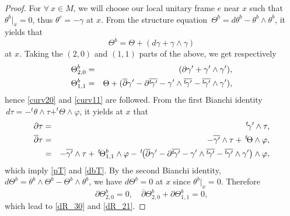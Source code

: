 \documentclass{amsart}
\numberwithin{equation}{section}
\theoremstyle{definition}
\renewcommand{\1}{\mathds{1}}
\renewcommand{\>}{\rightarrow}
\begin{document}
\begin{proof}
For $\forall\ x\in M$, we will choose our local unitary frame $e$ near $x$ such that $\theta^b\big|_{x}=0$, thus $\theta^c=-\gamma$ at $x$.
From the structure equation $\, \Theta^b = d \theta^b - \theta^b \wedge \theta^b$,  it yields that
\[\Theta^b = \Theta +  (d \gamma +  \gamma \wedge \gamma) \]
at $x$. Taking the $(2,0)$ and $(1,1)$ parts of the above, we get respectively
\begin{eqnarray}
\Theta^b_{2,0}&=& (\partial \gamma' +  \gamma' \wedge \gamma'), \notag\\
\Theta^b_{1,1}&=& \Theta + (\overline{\partial} \gamma' - \partial\overline{^t\!\gamma'}
-  \gamma' \wedge \overline{^t\!\gamma'} - \overline{^t\!\gamma'} \wedge \gamma'),\notag
\end{eqnarray}
hence \eqref{curv20} and \eqref{curv11} are followed. From the first Bianchi identity $\, d \tau = - ^t\!\theta \wedge \tau + ^t\!\!\Theta \wedge \varphi$,
it yields at $x$ that
\begin{eqnarray}
\partial \tau&=&  ^t\!\gamma' \wedge \tau, \notag\\
\overline{\partial} \tau&=& -\overline{\gamma'} \wedge \tau + \,^t\!\Theta \wedge \varphi,\notag \\
&=& -\overline{\gamma'} \wedge \tau + \,^t\!\Theta^b_{1,1} \wedge \varphi
- \,^t\!\big(\overline{\partial} \gamma' - \partial\overline{^t\!\gamma'}
-  \gamma' \wedge \overline{^t\!\gamma'} - \overline{^t\!\gamma'} \wedge \gamma'\big) \wedge \varphi, \notag
\end{eqnarray}
which imply \eqref{pT} and \eqref{dbT}. By the second Bianchi identity, $d \Theta^b = \theta^b \wedge \Theta^b - \Theta^b \wedge \theta^b$,
we have $d \Theta^b=0$ at $x$ since  $\theta^b\big|_{x}=0$. Therefore
\[\partial \Theta^b_{2,0}=0,\quad \overline{\partial} \Theta^b_{2,0}+ \partial \Theta^{b}_{1,1}=0, \]
which lead to \eqref{dR_30} and \eqref{dR_21}.
\end{proof}
\end{document}
